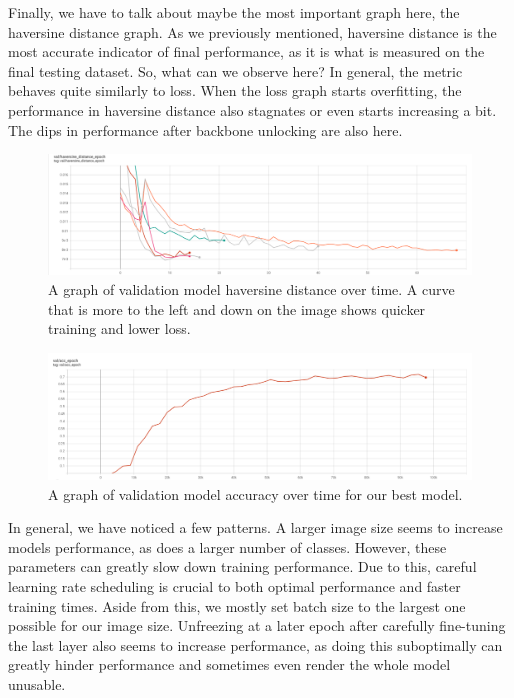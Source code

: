 \documentclass[]{article}
\begin{document}
Finally, we have to talk about maybe the most important graph here, the
haversine distance graph. As we previously mentioned, haversine distance
is the most accurate indicator of final performance, as it is what is
measured on the final testing dataset. So, what can we observe here? In
general, the metric behaves quite similarly to loss. When the loss graph
starts overfitting, the performance in haversine distance also stagnates
or even starts increasing a bit. The dips in performance after backbone
unlocking are also here.

\begin{figure}
\centering
\includegraphics[width=1\textwidth,height=\textheight]{./tex2pdf.-3ffa51a14b505aec/60a5557a30350689a894b7f2fe08c9cbbc6e454a.png}
\caption{A graph of validation model haversine distance over time. A
curve that is more to the left and down on the image shows quicker
training and lower loss.}
\end{figure}

\begin{figure}
\centering
\includegraphics[width=1\textwidth,height=\textheight]{./tex2pdf.-3ffa51a14b505aec/c7d3296c9e9c38144e5cdccd8c8e2221596727a5.png}
\caption{A graph of validation model accuracy over time for our best
model.}
\end{figure}

In general, we have noticed a few patterns. A larger image size seems to
increase models performance, as does a larger number of classes.
However, these parameters can greatly slow down training performance.
Due to this, careful learning rate scheduling is crucial to both optimal
performance and faster training times. Aside from this, we mostly set
batch size to the largest one possible for our image size. Unfreezing at
a later epoch after carefully fine-tuning the last layer also seems to
increase performance, as doing this suboptimally can greatly hinder
performance and sometimes even render the whole model unusable.
\end{document}
